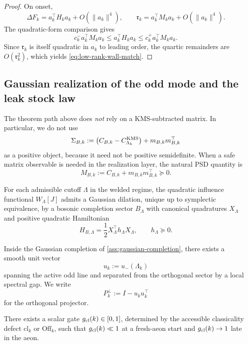 \begin{proof}
On onset,
\[
\Delta F_k=a_k^\top H_k a_k+O(\|a_k\|^4),
\qquad
\mathfrak r_k=a_k^\top M_k a_k+O(\|a_k\|^4).
\]
The quadratic-form comparison gives
\[
c_k^- a_k^\top M_k a_k\le a_k^\top H_k a_k\le c_k^+ a_k^\top M_k a_k.
\]
Since \(\mathfrak r_k\) is itself quadratic in \(a_k\) to leading order, the quartic remainders are \(O(\mathfrak r_k^2)\),
which yields \eqref{eq:low-rank-wall-match}.
\end{proof}

\subsection{Gaussian realization of the odd mode and the leak stock law}
\label{subsec:B-gaussian}

The theorem path above does \emph{not} rely on a KMS-subtracted matrix.
In particular, we do not use
\[
\Sigma_{B,k}:=\bigl(C_{B,k}-C^{\rm KMS}_{\Lambda_k}\bigr)+m_{B,k}m_{B,k}^\top
\]
as a positive object, because it need not be positive semidefinite.
When a safe matrix observable is needed in the realization layer, the natural PSD quantity is
\begin{equation}
M_{B,k}:=C_{B,k}+m_{B,k}m_{B,k}^\top\succeq 0.
\label{eq:MB-def}
\end{equation}

\begin{assumption}
\label{ass:gaussian-completion}
For each admissible cutoff \(\Lambda\) in the welded regime, the quadratic influence functional \(W_\Lambda[J]\) admits a
Gaussian dilation, unique up to symplectic equivalence, by a bosonic completion sector \(B_\Lambda\) with canonical
quadratures \(X_\Lambda\) and positive quadratic Hamiltonian
\[
H_{B,\Lambda}=\frac12 X_\Lambda^\top h_\Lambda X_\Lambda,
\qquad h_\Lambda\succeq 0.
\]
\end{assumption}

\begin{assumption}
\label{ass:export-selection}
Inside the Gaussian completion of \cref{ass:gaussian-completion}, there exists a smooth unit vector
\[
u_k:=u_-(\Lambda_k)
\]
spanning the active odd line and separated from the orthogonal sector by a local spectral gap.
We write
\[
P_k^\perp:=I-u_k u_k^\top
\]
for the orthogonal projector.
\end{assumption}

\begin{assumption}
\label{ass:classical-gate}
There exists a scalar gate \(g_{\rm cl}(k)\in[0,1]\), determined by the accessible classicality defect
\(\mathrm{cl}_k\) or \(\mathrm{Off}_k\), such that \(g_{\rm cl}(k)\ll 1\) at a fresh-aeon start and
\(g_{\rm cl}(k)\to 1\) late in the aeon.
\end{assumption}

